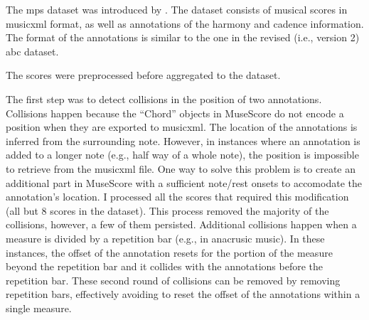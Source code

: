 

The \gls{mps} dataset was introduced by
\textcite{hentschel2021annotated}. The dataset consists of
musical scores in \gls{musicxml} format, as well as annotations of
the harmony and cadence information. The format of the
annotations is similar to the one in the revised (i.e.,
version 2) \gls{abc} dataset.


The scores were preprocessed before aggregated to the
dataset.

The first step was to detect collisions in the position of
two annotations. Collisions happen because the ``Chord''
objects in MuseScore do not encode a position when they are
exported to \gls{musicxml}. The location of the annotations is
inferred from the surrounding note. However, in instances
where an annotation is added to a longer note (e.g., half
way of a whole note), the position is impossible to retrieve
from the \gls{musicxml} file. One way to solve this problem is to
create an additional part in MuseScore with a sufficient
note/rest onsets to accomodate the annotation's location. I
processed all the scores that required this modification
(all but 8 scores in the dataset). This process removed
the majority of the collisions, however, a few of them
persisted. Additional collisions happen when a measure is
divided by a repetition bar (e.g., in anacrusic music). In
these instances, the offset of the annotation resets for the
portion of the measure beyond the repetition bar and it
collides with the annotations before the repetition bar.
These second round of collisions can be removed by removing
repetition bars, effectively avoiding to reset the offset of
the annotations within a single measure.
